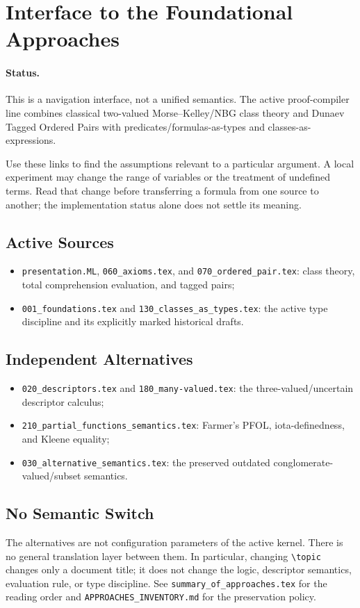 \def\topic{Foundational Approach Interface}

\section{Interface to the Foundational Approaches}

\paragraph{Status.}
This is a navigation interface, not a unified semantics. The active
proof-compiler line combines classical two-valued Morse--Kelley/NBG class
theory and Dunaev Tagged Ordered Pairs with predicates/formulas-as-types and
classes-as-expressions.

Use these links to find the assumptions relevant to a particular argument.
A local experiment may change the range of variables or the treatment of
undefined terms. Read that change before transferring a formula from one
source to another; the implementation status alone does not settle its
meaning.

\subsection{Active Sources}
\begin{itemize}
\item \texttt{presentation.ML}, \texttt{060\_axioms.tex}, and
  \texttt{070\_ordered\_pair.tex}: class theory, total comprehension
  evaluation, and tagged pairs;
\item \texttt{001\_foundations.tex} and \texttt{130\_classes\_as\_types.tex}:
  the active type discipline and its explicitly marked historical drafts.
\end{itemize}

\subsection{Independent Alternatives}
\begin{itemize}
\item \texttt{020\_descriptors.tex} and \texttt{180\_many-valued.tex}:
  the three-valued/uncertain descriptor calculus;
\item \texttt{210\_partial\_functions\_semantics.tex}: Farmer's PFOL,
  iota-definedness, and Kleene equality;
\item \texttt{030\_alternative\_semantics.tex}: the preserved outdated
  conglomerate-valued/subset semantics.
\end{itemize}

\subsection{No Semantic Switch}
The alternatives are not configuration parameters of the active kernel.
There is no general translation layer between them. In particular, changing
\verb|\topic| changes only a document title; it does not change the logic,
descriptor semantics, evaluation rule, or type discipline. See
\texttt{summary\_of\_approaches.tex} for the reading order and
\texttt{APPROACHES\_INVENTORY.md} for the preservation policy.


